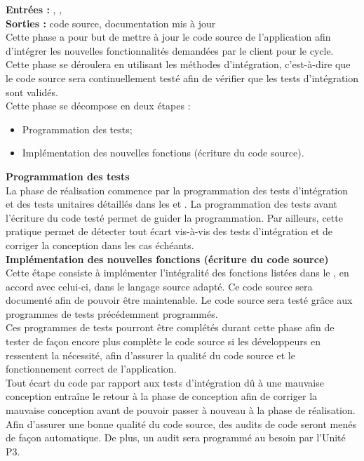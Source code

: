 \textbf{Entrées :} \DCCourt , \PTUCourt , \PTICourt \\
\textbf{Sorties :} code source, documentation mis à jour \\
Cette phase a pour but de mettre à jour le code source de l’application afin d’intégrer les nouvelles fonctionnalités demandées par le client pour le cycle. Cette phase se déroulera en utilisant les méthodes d’intégration, c’est-à-dire que le code source sera continuellement testé afin de vérifier que les tests d’intégration sont validés.\\ 
Cette phase se décompose en deux étapes :
\begin{itemize}
\item Programmation des tests;
\item Implémentation des nouvelles fonctions (écriture du code source).\\
\end{itemize}

\textbf{Programmation des tests} \\
La phase de réalisation commence par la programmation des tests d’intégration et des tests unitaires détaillés dans les \PTICourt{} et \PTUCourt . 
La programmation des tests avant l’écriture du code testé permet de guider la programmation. 
Par ailleurs, cette pratique permet de détecter tout écart vis-à-vis des tests d’intégration et de corriger la conception dans les cas échéants.\\

\textbf{Implémentation des nouvelles fonctions (écriture du code source)} \\
Cette étape consiste à implémenter l’intégralité des fonctions listées dans le \DCCourt, en accord avec celui-ci, dans le langage source adapté. Ce code source sera documenté afin de pouvoir être maintenable.
Le code source sera testé grâce aux programmes de tests précédemment programmés.\\
Ces programmes de tests pourront être complétés durant cette phase afin de tester de façon encore plus complète le code source si les développeurs en ressentent la nécessité, afin d’assurer la qualité du code source et le fonctionnement correct de l’application. \\
Tout écart du code par rapport aux tests d’intégration dû à une mauvaise conception entraîne le retour à la phase de conception afin de corriger la mauvaise conception avant de pouvoir passer à nouveau à la phase de réalisation.
Afin d’assurer une bonne qualité du code source, des audits de code seront menés de façon automatique. De plus, un audit sera programmé au besoin par l’Unité P3.


